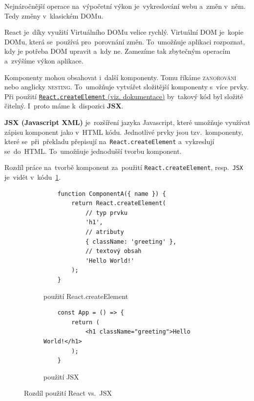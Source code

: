 \documentclass[14pt,a4paper]{article}
\begin{document}
        Nejnáročnější operace na~výpočetní výkon je~vykreslování webu a~změn v~něm. Tedy změny v~klasickém DOMu.

        React je~díky využití Virtuálního DOMu velice rychlý. Virtuální DOM je~kopie DOMu, která se~používá pro~porovnání změn.
        To~umožňuje aplikaci rozpoznat, kdy je potřeba DOM upravit a~kdy ne. Zamezíme tak zbytečným operacím a~zvýšíme výkon aplikace. \parencite{elrom2021react}

        Komponenty mohou obsahovat i~další komponenty. Tomu říkáme \textsc{zanořování} nebo anglicky \textsc{nesting}. To~umožňuje vytvářet složitější komponenty s~více prvky.
        Při použití \href{https://react.dev/reference/react/createElement}{\texttt{React.createElement} (viz. dokumentace)} by~takový kód byl složitě čitelný. I~proto máme k~dispozici \textbf{JSX}.
        
        \textbf{JSX (Javascript XML)} je~rozšíření jazyka Javascript, které umožňuje využívat zápisu komponent jako v~HTML kódu. Jednotlivé prvky jsou tzv.~komponenty, které se~při~překladu přepisují na~\texttt{React.createElement} a~vykreslují se~do~HTML. To~umožňuje jednodušší tvorbu komponent. \parencite{reactJSX}

        Rozdíl práce na~tvorbě komponent za~použití \texttt{React.createElement}, resp.~\texttt{JSX} je~vidět v~kódu~\ref{JSXcomponent}.
        \begin{figure}
            \begin{subfigure}[b]{0.45\linewidth}
                \begin{verbatim}
    function ComponentA({ name }) {
        return React.createElement(
            // typ prvku
            'h1',
            // atributy
            { className: 'greeting' },
            // textový obsah
            'Hello World!'
        );
    }
                \end{verbatim}
                \caption{použití React.createElement}
            \end{subfigure}
            \hfill
            \begin{subfigure}[b]{0.45\linewidth}
                \begin{verbatim}
    const App = () => {
        return (
            <h1 className="greeting">Hello World!</h1>
        );
    }
                \end{verbatim}
                \vspace{1cm}
                \caption{použití JSX}
            \end{subfigure}
            \label{JSXcomponent}
            \caption{Rozdíl použití React vs.~JSX}
        \end{figure}
\end{document}
